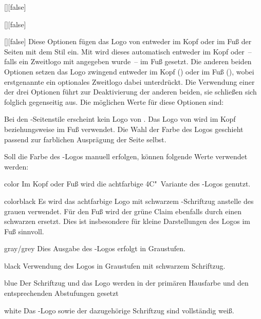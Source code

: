 \begin{Declaration*}{}
\begin{Declaration*}{}
\begin{Declaration*}{}
\begin{Declaration}{[\PSet]}[false]
\begin{Declaration}[v2.02]{[\PSet]}[false]
\begin{Declaration}{[\PSet]}[false]
\printdeclarationlist%
%
%
%
%
%
Diese Optionen fügen das Logo von \DDC entweder im Kopf oder im Fuß der Seiten
mit dem Stil  ein. Mit  wird dieses 
automatisch entweder im Kopf oder~-- falls ein Zweitlogo mit  
angegeben wurde~-- im Fuß gesetzt. Die anderen beiden Optionen setzen das Logo 
zwingend entweder im Kopf () oder im Fuß (), 
wobei erstgenannte ein optionales Zweitlogo dabei unterdrückt. Die Verwendung 
einer der drei Optionen führt zur Deaktivierung der anderen beiden, sie 
schließen sich folglich gegenseitig aus. Die möglichen Werte für diese Optionen 
sind:
%
\begin{values}
\itemfalse
  Bei den -Seitenstile erscheint kein Logo von \DDC.
\itemtrue*
  Das Logo von \DDC wird im Kopf beziehungsweise im Fuß verwendet. Die Wahl der 
  Farbe des Logos geschieht passend zur farblichen Ausprägung der Seite selbst.
\end{values}
%
Soll die Farbe des \DDC-Logos manuell erfolgen, können folgende Werte verwendet 
werden:
%
\begin{values}
\item[color]
  Im Kopf oder Fuß wird die achtfarbige 4C"~Variante des \DDC-Logos genutzt.
\item[colorblack]
  Es wird das achtfarbige Logo mit schwarzem \DDC-Schriftzug anstelle des 
  grauen verwendet. Für den Fuß wird der grüne Claim ebenfalls durch einen 
  schwarzen ersetzt. Dies ist insbesondere für kleine Darstellungen des Logos 
  im Fuß sinnvoll.
\item[gray/grey]
  Dies Ausgabe des \DDC-Logos erfolgt in Graustufen.
\item[black]
  Verwendung des Logos in Graustufen mit schwarzem Schriftzug.
\item[blue]
  Der Schriftzug und das Logo werden in der primären Hausfarbe  
  und den entsprechenden Abstufungen gesetzt
\item[white]
  Das \DDC-Logo sowie der dazugehörige Schriftzug sind vollständig weiß.

\end{values}
\end{Declaration}
\end{Declaration}
\end{Declaration}
\end{Declaration*}
\end{Declaration*}
\end{Declaration*}
